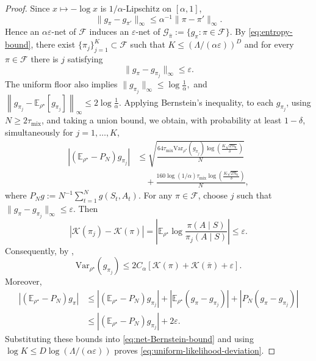 \documentclass{article}
\theoremstyle{definition}
\theoremstyle{remark}
\theoremstyle{plain}
\newcommand{\E}{\mathbb{E}}
\newcommand{\Var}{\mathrm{Var}}
\numberwithin{equation}{section}
\begin{document}
\begin{proof}
Since \(x\mapsto-\log x\) is \(1/\alpha\)-Lipschitz on
\([\alpha,1]\),
\[
    \|g_\pi-g_{\pi'}\|_\infty
    \leq
    \alpha^{-1}\|\pi-\pi'\|_\infty.
\]
Hence an \(\alpha\varepsilon\)-net of \(\mathcal F\) induces an
\(\varepsilon\)-net of
\(
    \mathcal G_{\bar\pi}
    :=
    \{g_\pi:\pi\in\mathcal F\}.
\)
By \eqref{eq:entropy-bound}, there exist
\(\{\pi_j\}_{j=1}^K\subset\mathcal F\) such that
\(
    K
    \leq
    \left(
        {\Lambda}/({\alpha\varepsilon})
    \right)^D
\)
and for every \(\pi\in\mathcal F\) there is \(j\) satisfying
\[
    \|g_\pi-g_{\pi_j}\|_\infty
    \leq
    \varepsilon.
\]
The uniform floor also implies
\(
    \|g_{\pi_j}\|_\infty
    \leq
    \log\frac1\alpha,
\)
and
\(
    \left\|
        g_{\pi_j}
        -
        \E_{\rho^\star}[g_{\pi_j}]
    \right\|_\infty
    \leq
    2\log\frac1\alpha.
\)
Applying Bernstein's inequality,    to each \(g_{\pi_j}\),
using \(N\geq2\tau_{\mathrm{mix}}\), and taking a union bound, we obtain,
with probability at least \(1-\delta\), simultaneously for
\(j=1,\ldots,K\),
\begin{align}
\label{eq:net-Bernstein-bound}
    |
        (\E_{\rho^\star} - P_N)g_{\pi_j}  
    |
    &\leq
    \sqrt{
        \frac{
            64\tau_{\mathrm{mix}}
            \Var_{\rho^\star}(g_{\pi_j})
    \log\left(\frac{K\sqrt{2\mathfrak N_0}}{\delta}\right)
        }{N}
    }
    \nonumber\\
    &\quad+
    \frac{
160\log(1/\alpha)\tau_{\mathrm{mix}} 
    \log\left(\frac{K\sqrt{2\mathfrak N_0}}{\delta}\right)
    }{N},
\end{align}
where $P_N g := N^{-1} \sum_{t=1}^N g(S_t, A_t)$. 
For any \(\pi\in\mathcal F\), choose \(j\) such that
\(\|g_\pi-g_{\pi_j}\|_\infty\leq\varepsilon\). Then
\[
    |\mathcal K(\pi_j)-\mathcal K(\pi)|
    =
    \left|
        \E_{\rho^\star}
        \log\frac{\pi(A\mid S)}{\pi_j(A\mid S)}
    \right|
    \leq
    \varepsilon.
\]
Consequently, by
,
\[
    \Var_{\rho^\star}(g_{\pi_j})
    \leq
    2C_\alpha
    \left[
        \mathcal K(\pi)
        +
        \mathcal K(\bar\pi)
        +
        \varepsilon
    \right].
\]
Moreover,
\[
\begin{aligned}
    |(\E_{\rho^\star}-P_N)g_\pi|
    &\leq
    |(\E_{\rho^\star}-P_N)g_{\pi_j}|
    +
    |\E_{\rho^\star}(g_\pi-g_{\pi_j})|
    +
    |P_N(g_\pi-g_{\pi_j})|
    \\
    &\leq
    |(\E_{\rho^\star}-P_N)g_{\pi_j}|
    +
    2\varepsilon.
\end{aligned}
\]
Substituting these bounds into
\eqref{eq:net-Bernstein-bound} and using
\(
    \log K
    \leq
    D\log\left(
        {\Lambda}/{(\alpha\varepsilon)}
    \right)
\)
proves \eqref{eq:uniform-likelihood-deviation}.
\end{proof}
\end{document}
